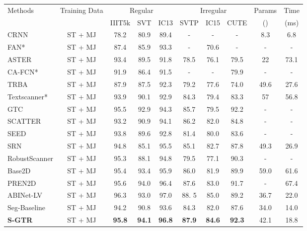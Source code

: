 \documentclass[letterpaper]{article} \usepackage{aaai22}  \usepackage{times}  \usepackage{helvet}  \usepackage{courier}  \usepackage[hyphens]{url}  \usepackage{graphicx} \urlstyle{rm} \def\UrlFont{\rm}  \usepackage{natbib}  \usepackage{caption} \DeclareCaptionStyle{ruled}{labelfont=normalfont,labelsep=colon,strut=off} \frenchspacing  \setlength{\pdfpagewidth}{8.5in}  \setlength{\pdfpageheight}{11in}
\newcommand{\bt}{\color{black}}
\begin{document}
\begin{table*}[t]
	\footnotesize
	\centering
	\begin{tabular}{l|c|c|c|c|c|c|c|c|c}
		\hline
		\multirow{2}{*}{Methods} & \multirow{2}{*}{Training Data}   & \multicolumn{3}{c}{Regular} & \multicolumn{3}{|c|}{Irregular} & \multirow{1}{*}{Params} &\multirow{1}{*}{Time}  \\
\cline{3-8}
		&  &IIIT5k & SVT  & IC13 & SVTP & IC15 &CUTE & () & (ms)  \\
\hline
		CRNN \cite{shi2016end} &ST + MJ & 78.2 & 80.9 & 89.4 & -	 &-	  & - & 8.3  & 6.8\\
		FAN* \cite{cheng2017focusing} & ST + MJ  & 87.4 & 85.9 & 93.3 & -  & 70.6 & -  & - & - \\ 
		ASTER \cite{shi2018aster}& ST + MJ  & 93.4 & 89.5 & 91.8 & 78.5 & 76.1 & 79.5 & 22 & 73.1\\
		CA-FCN* \cite{liao2019scene}& ST + MJ & 91.9 & 86.4 & 91.5 & -  & - & 79.9 & -&-\\
		TRBA \cite{baek2019wrong} &ST + MJ & 87.9 & 87.5 & 92.3 & 79.2 &77.6  & 74.0 &49.6 &27.6\\
		Textscanner* \cite{wan2020textscanner}  & ST + MJ &93.9	&90.1 &92.9 &84.3 &79.4 &83.3& 57   & 56.8\\  
		GTC \cite{hu2020gtc}&ST + MJ & 95.5 & 92.9 & 94.3 & 85.7 &  79.5 & 92.2 &- &-\\
		SCATTER \cite{litman2020scatter} &ST + MJ &93.2 &90.9 &94.1 &86.2 &82.0 &84.8 &- & - \\
		SEED \cite{qiao2020seed} &ST + MJ &93.8 &89.6 &92.8 &81.4 &80.0 &83.6&- &- \\
		SRN \cite{yu2020towards}& ST + MJ & 94.8 & 85.1 & 95.5 & 85.1 & 82.7 & 87.8 & 49.3 & 26.9\\
		RobustScanner \cite{yue2020robustscanner} &ST + MJ  &95.3&88.1&94.8& 79.5 &77.1 &90.3 &-&-\\
		Base2D \cite{yan2021primitive} & ST + MJ &95.4 &93.4 &95.9 &86.0 &81.9 & 89.9 & 59.0 &61.6 \\ 
		PREN2D \cite{yan2021primitive} &ST + MJ  &95.6 &94.0 &96.4 &87.6 &83.0 & 91.7 & - &67.4 \\
\bt ABINet-LV \cite{fang2021read}  &ST + MJ   &96.3   & 93.0  & 97.0  & 88. 5   & 85.0  & 89.2   & 36.7 & 22.0\\
		\hline
		Seg-Baseline &ST + MJ  &94.2	&90.8 &93.6	&84.3 &82.0 &87.6 & 34.0 & 14.0\\
		\textbf{S-GTR}         &ST + MJ  &\bf{95.8} & \bf{94.1} & \bf{96.8} &\bf{87.9}	&\bf{84.6}	& \bf{92.3} &42.1 & 18.8\\ 

\end{tabular}
\end{table*}
\end{document}
